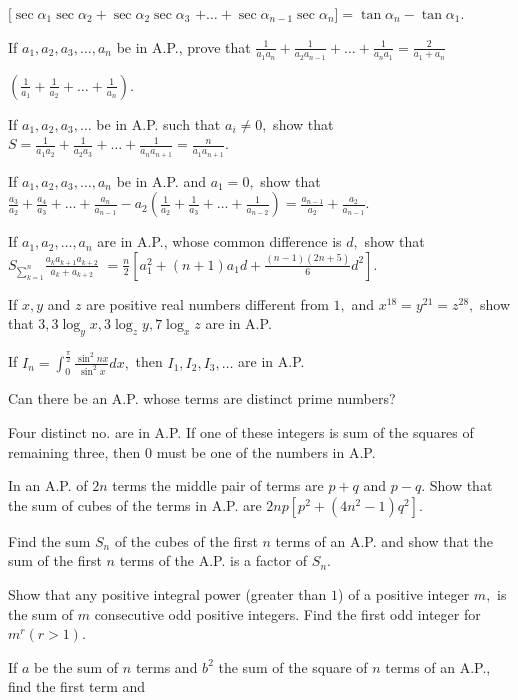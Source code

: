   $[\sec\alpha_1\sec\alpha_2 + \sec\alpha_2\sec\alpha_3$ $+ \ldots + \sec\alpha_{n - 1}\sec\alpha_n] = \tan\alpha_n -
  \tan\alpha_1$.
\item If $a_1, a_2, a_3, \ldots, a_n$ be in A.P., prove that $\frac{1}{a_1a_n} + \frac{1}{a_2a_{n - 1}} + \ldots +
  \frac{1}{a_na_1} =\frac{2}{a_1 + a_n}$

  $\left(\frac{1}{a_1} + \frac{1}{a_2} + \ldots + \frac{1}{a_n}\right)$.
\item If $a_1, a_2, a_3, \ldots$ be in A.P. such that $a_i\neq 0,$ show that $S = \frac{1}{a_1a_2} + \frac{1}{a_2a_3}
  + \ldots + \frac{1}{a_na_{n + 1}} = \frac{n}{a_1a_{n + 1}}$.
\item If $a_1, a_2, a_3, \ldots, a_n$ be in A.P. and $a_1 = 0,$ show that $\frac{a_3}{a_2} + \frac{a_4}{a_3} + \ldots +
  \frac{a_n}{a_{n - 1}} - a_2\left(\frac{1}{a_2} + \frac{1}{a_3} + \ldots + \frac{1}{a_{n - 2}}\right) = \frac{a_{n - 1}}{a_2} +
  \frac{a_2}{a_{n - 1}}$.
\item If $a_1, a_2, \ldots, a_n$ are in A.P., whose common difference is $d,$ show that $S_{\sum_{k = 1}^n}\frac{a_ka_{k +
    1}a_{k + 2}}{a_k+a_{k + 2}}$ $= \frac{n}{2}\left[a_1^2 + (n + 1)a_1d + \frac{(n - 1)(2n + 5)}{6}d^2\right]$.
\item If $x, y$ and $z$ are positive real numbers different from $1,$ and $x^{18} = y^{21} = z^{28},$ show that $3, 3\log_y
  x, 3\log_z y, 7\log_x z$ are in A.P.
\item If $\displaystyle I_n = \int_{0}^{\frac{\pi}{2}}\frac{\sin^2nx}{\sin^2x}dx,$ then $I_1, I_2, I_3, \ldots$ are in A.P.
\item Can there be an A.P. whose terms are distinct prime numbers?
\item Four distinct no. are in A.P. If one of these integers is sum of the squares of remaining three, then $0$ must be
  one of the numbers in A.P.
\item In an A.P. of $2n$ terms the middle pair of terms are $p + q$ and $p - q.$ Show that the sum of cubes of the terms
  in A.P. are $2np[p^2 + (4n^2 - 1)q^2]$.
\item Find the sum $S_n$ of the cubes of the first $n$ terms of an A.P. and show that the sum of the first $n$ terms of
  the A.P. is a factor of $S_n$.
\item Show that any positive integral power (greater than $1$) of a positive integer $m,$ is the sum of $m$ consecutive
  odd positive integers. Find the first odd integer for $m^r(r > 1)$.
\item If $a$ be the sum of $n$ terms and $b^2$ the sum of the square of $n$ terms of an A.P., find the first term and
